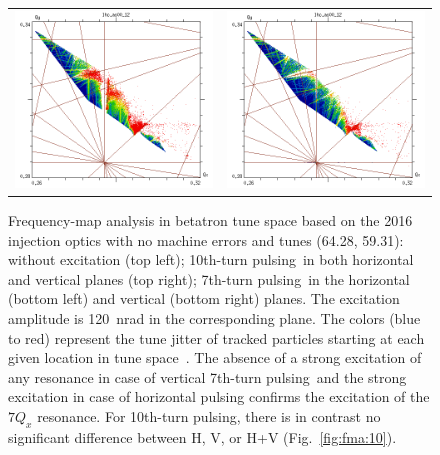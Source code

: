 \documentclass[aps
,prstab
,reprint
,longbibliography
,preprintnumbers
,showkeys
,amsfonts,amssymb,amsmath
,floatfix
]{revtex4-1}
\newcommand{\seventhtp}{7th-turn pulsing}
\newcommand{\tenthtp}{10th-turn pulsing}
\newlength{\fmawidth}
\begin{document}
\begin{figure}
\begin{tabular}{cc}
    \includegraphics[width=\fmawidth]{2016injnocolc15o+19_6noerrut7skh_dp0_ord7.png} &
    \includegraphics[width=\fmawidth]{2016injnocolc15o+19_6noerrut7skv_dp0_ord7.png} \\
  \end{tabular}
  \caption{Frequency-map analysis in betatron tune space based on the
    2016 injection optics with no machine errors and tunes (64.28,
    59.31): without excitation (top left); \tenthtp\ in both
    horizontal and vertical planes (top right); \seventhtp\ in the
    horizontal (bottom left) and vertical (bottom right) planes. The
    excitation amplitude is 120~nrad in the corresponding plane. The
    colors (blue to red) represent the tune jitter of tracked
    particles starting at each given location in tune
    space~\cite{fmalaskar}. The absence of a strong excitation of any
    resonance in case of vertical \seventhtp\ and the strong
    excitation in case of horizontal pulsing confirms the excitation
    of the $7 Q_x$ resonance. For \tenthtp, there is in contrast no
    significant difference between H, V, or H+V
    (Fig.~\ref{fig:fma:10}).}
  \label{fig:patternfma}
\end{figure}
\end{document}

